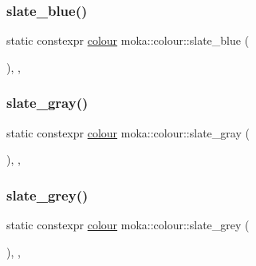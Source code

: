 \mbox{\label{classmoka_1_1colour_a1f4310526da720db40aebe43952105f7}} 
\subsubsection{\texorpdfstring{slate\_blue()}{slate\_blue()}}
{\footnotesize\ttfamily static constexpr \mbox{\hyperlink{classmoka_1_1colour}{colour}} moka\+::colour\+::slate\+\_\+blue (\begin{DoxyParamCaption}{ }\end{DoxyParamCaption})\hspace{0.3cm}{\ttfamily [inline]}, {\ttfamily [static]}, {\ttfamily [noexcept]}}

\mbox{\label{classmoka_1_1colour_ac6022346709ec89fb86ff79af2cabd96}} 
\subsubsection{\texorpdfstring{slate\_gray()}{slate\_gray()}}
{\footnotesize\ttfamily static constexpr \mbox{\hyperlink{classmoka_1_1colour}{colour}} moka\+::colour\+::slate\+\_\+gray (\begin{DoxyParamCaption}{ }\end{DoxyParamCaption})\hspace{0.3cm}{\ttfamily [inline]}, {\ttfamily [static]}, {\ttfamily [noexcept]}}

\mbox{\label{classmoka_1_1colour_aafdbac070bb056e8efc65ed8d0061c8b}} 
\subsubsection{\texorpdfstring{slate\_grey()}{slate\_grey()}}
{\footnotesize\ttfamily static constexpr \mbox{\hyperlink{classmoka_1_1colour}{colour}} moka\+::colour\+::slate\+\_\+grey (\begin{DoxyParamCaption}{ }\end{DoxyParamCaption})\hspace{0.3cm}{\ttfamily [inline]}, {\ttfamily [static]}, {\ttfamily [noexcept]}}


